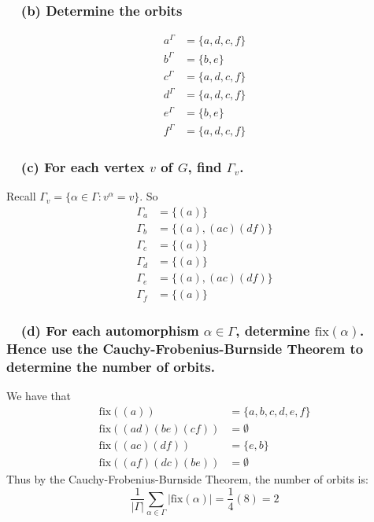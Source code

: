 \documentclass[letterpaper, 11pt]{article}
\newcommand{\1}{\mathds{1}}	%
\theoremstyle{definition}
\begin{document}
\subsubsection*{ \ \ (b) Determine the orbits}
\begin{align*}
a^{\Gamma} &= \{a, d, c, f\} \\ 
b^{\Gamma} &= \{b, e\} \\ 
c^{\Gamma} &= \{a, d, c, f\} \\ 
d^{\Gamma} &= \{a, d, c, f\} \\ 
e^{\Gamma} &= \{b, e\} \\ 
f^{\Gamma} &= \{a, d, c, f\} 
\end{align*}
\subsubsection*{ \ \ (c) For each vertex $v$ of $G$, find $\Gamma_v$.}
Recall $\Gamma _v = \{\alpha \in \Gamma: v^\alpha = v\}$. So 
\begin{align*}
{\Gamma}_a &= \{(a)\} \\ 
{\Gamma}_b &= \{(a), (ac)(df)\} \\ 
{\Gamma}_c &= \{(a)\} \\ 
{\Gamma}_d &= \{(a)\} \\ 
{\Gamma}_e &= \{(a), (ac)(df)\} \\ 
{\Gamma}_f &= \{(a)\} 
\end{align*}
\subsubsection*{ \ \ (d) For each automorphism $\alpha \in \Gamma$, determine $\mathrm{fix}(\alpha)$. Hence use the Cauchy-Frobenius-Burnside Theorem to determine the number of orbits.}
We have that 
\begin{align*}
\text{fix}((a)) & = \{a, b, c, d, e, f\}\\
\text{fix}((ad)(be)(cf)) & = \emptyset \\
\text{fix}((ac)(df)) & = \{e, b\}\\
\text{fix}((af)(dc)(be)) & = \emptyset
\end{align*}
Thus by the Cauchy-Frobenius-Burnside Theorem, the number of orbits is: \[
\frac{1}{|\Gamma|} \sum \limits _{\alpha \in \Gamma} |\text{fix}(\alpha)| = \frac{1}{4} (8) = 2
\]
\end{document}

